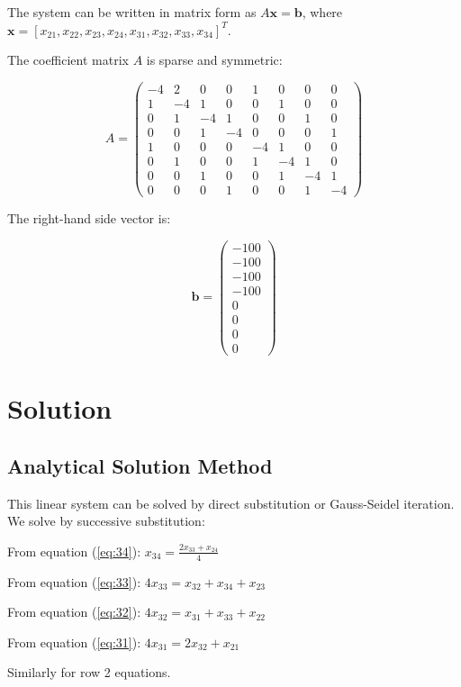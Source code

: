 \documentclass{article}
\begin{document}
The system can be written in matrix form as $A\mathbf{x} = \mathbf{b}$, where $\mathbf{x} = [x_{21}, x_{22}, x_{23}, x_{24}, x_{31}, x_{32}, x_{33}, x_{34}]^T$.

The coefficient matrix $A$ is sparse and symmetric:

\[
A = \begin{pmatrix}
-4 & 2 & 0 & 0 & 1 & 0 & 0 & 0 \\
1 & -4 & 1 & 0 & 0 & 1 & 0 & 0 \\
0 & 1 & -4 & 1 & 0 & 0 & 1 & 0 \\
0 & 0 & 1 & -4 & 0 & 0 & 0 & 1 \\
1 & 0 & 0 & 0 & -4 & 1 & 0 & 0 \\
0 & 1 & 0 & 0 & 1 & -4 & 1 & 0 \\
0 & 0 & 1 & 0 & 0 & 1 & -4 & 1 \\
0 & 0 & 0 & 1 & 0 & 0 & 1 & -4
\end{pmatrix}
\]

The right-hand side vector is:

\[
\mathbf{b} = \begin{pmatrix}
-100 \\ -100 \\ -100 \\ -100 \\ 0 \\ 0 \\ 0 \\ 0
\end{pmatrix}
\]

\section{Solution}

\subsection{Analytical Solution Method}
This linear system can be solved by direct substitution or Gauss-Seidel iteration. We solve by successive substitution:

From equation (\ref{eq:34}): $x_{34} = \frac{2x_{33} + x_{24}}{4}$

From equation (\ref{eq:33}): $4x_{33} = x_{32} + x_{34} + x_{23}$

From equation (\ref{eq:32}): $4x_{32} = x_{31} + x_{33} + x_{22}$

From equation (\ref{eq:31}): $4x_{31} = 2x_{32} + x_{21}$

Similarly for row 2 equations.
\end{document}
